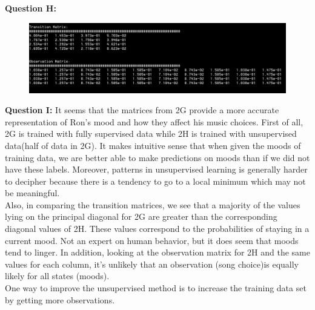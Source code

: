 \documentclass[12 pt]{article}
\begin{document}
	\noindent\textbf{Question H:} 
	\begin{figure}[H]
	\includegraphics[width=\linewidth]{2H}
	\end{figure} 

	\noindent\textbf{Question I:}
	\noindent It seems that the matrices from 2G provide a more accurate representation  of Ron's mood and how they affect his music choices. First of all, 2G is trained with fully supervised data while 2H is trained with unsupervised data(half of data in 2G). It makes intuitive sense that when given the moods of training data, we are better able to make predictions on moods than if we did not have these labels. Moreover, patterns in unsupervised learning is generally harder to decipher because there is a tendency to go to a local minimum which may not be meaningful.\\
	
	 \noindent Also, in comparing the transition matrices, we see that a majority of the values lying on the principal diagonal for 2G are greater than the corresponding diagonal values of 2H. These values correspond to the probabilities of staying in a current mood. Not an expert on human behavior, but it does seem that moods tend to linger. In addition, looking at the observation matrix for 2H and the same values for each column, it's unlikely that an observation (song choice)is equally likely for all states (moods).\\
	 
	 \noindent One way to improve the unsupervised method is to increase the training data set by getting more observations.\\
	 
\end{document}
